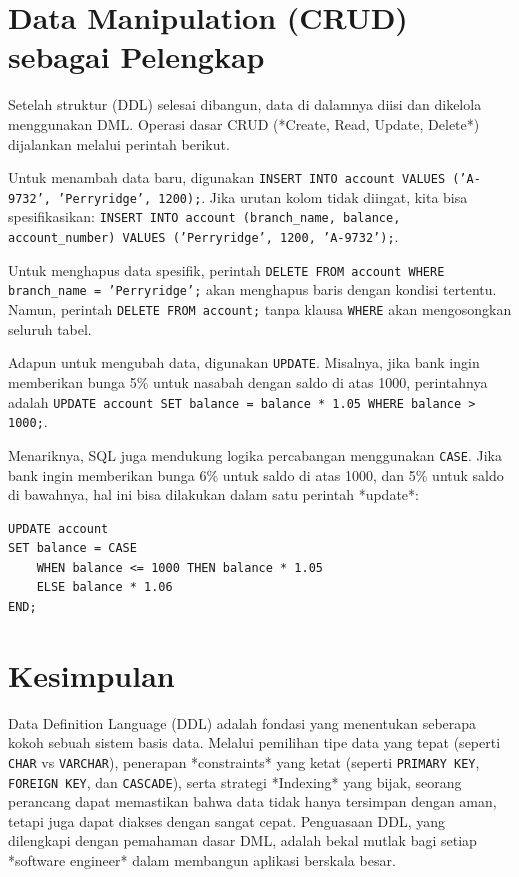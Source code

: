 \documentclass[11pt,a4paper]{article}
\begin{document}
\section{Data Manipulation (CRUD) sebagai Pelengkap}

Setelah struktur (DDL) selesai dibangun, data di dalamnya diisi dan dikelola menggunakan DML. Operasi dasar CRUD (*Create, Read, Update, Delete*) dijalankan melalui perintah berikut.

Untuk menambah data baru, digunakan \texttt{INSERT INTO account VALUES ('A-9732', 'Perryridge', 1200);}. Jika urutan kolom tidak diingat, kita bisa spesifikasikan: \texttt{INSERT INTO account (branch\_name, balance, account\_number) VALUES ('Perryridge', 1200, 'A-9732');}.

Untuk menghapus data spesifik, perintah \texttt{DELETE FROM account WHERE branch\_name = 'Perryridge';} akan menghapus baris dengan kondisi tertentu. Namun, perintah \texttt{DELETE FROM account;} tanpa klausa \texttt{WHERE} akan mengosongkan seluruh tabel.

Adapun untuk mengubah data, digunakan \texttt{UPDATE}. Misalnya, jika bank ingin memberikan bunga 5\% untuk nasabah dengan saldo di atas 1000, perintahnya adalah \texttt{UPDATE account SET balance = balance * 1.05 WHERE balance > 1000;}.

Menariknya, SQL juga mendukung logika percabangan menggunakan \texttt{CASE}. Jika bank ingin memberikan bunga 6\% untuk saldo di atas 1000, dan 5\% untuk saldo di bawahnya, hal ini bisa dilakukan dalam satu perintah *update*:

\begin{lstlisting}
UPDATE account
SET balance = CASE
    WHEN balance <= 1000 THEN balance * 1.05
    ELSE balance * 1.06
END;
\end{lstlisting}

\section{Kesimpulan}

Data Definition Language (DDL) adalah fondasi yang menentukan seberapa kokoh sebuah sistem basis data. Melalui pemilihan tipe data yang tepat (seperti \texttt{CHAR} vs \texttt{VARCHAR}), penerapan *constraints* yang ketat (seperti \texttt{PRIMARY KEY}, \texttt{FOREIGN KEY}, dan \texttt{CASCADE}), serta strategi *Indexing* yang bijak, seorang perancang dapat memastikan bahwa data tidak hanya tersimpan dengan aman, tetapi juga dapat diakses dengan sangat cepat. Penguasaan DDL, yang dilengkapi dengan pemahaman dasar DML, adalah bekal mutlak bagi setiap *software engineer* dalam membangun aplikasi berskala besar.
\end{document}
